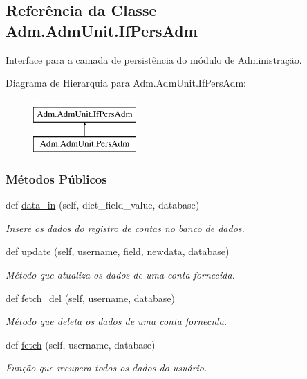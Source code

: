 \hypertarget{classAdm_1_1AdmUnit_1_1IfPersAdm}{}\subsection{Referência da Classe Adm.\+Adm\+Unit.\+If\+Pers\+Adm}
\label{classAdm_1_1AdmUnit_1_1IfPersAdm}


Interface para a camada de persistência do módulo de Administração.  


Diagrama de Hierarquia para Adm.\+Adm\+Unit.\+If\+Pers\+Adm\+:\begin{figure}[H]
\begin{center}
\leavevmode
\includegraphics[height=2.000000cm]{d0/dce/classAdm_1_1AdmUnit_1_1IfPersAdm}
\end{center}
\end{figure}
\subsubsection*{Métodos Públicos}
\begin{DoxyCompactItemize}
\item 
def \hyperlink{classAdm_1_1AdmUnit_1_1IfPersAdm_abf01de08eb9d6517cdcb44321ea12ce7}{data\+\_\+in} (self, dict\+\_\+field\+\_\+value, database)
\begin{DoxyCompactList}\small\item\em Insere os dados do registro de contas no banco de dados. \end{DoxyCompactList}\item 
def \hyperlink{classAdm_1_1AdmUnit_1_1IfPersAdm_a34acb7c8c60b0e90429cfbcc28424852}{update} (self, username, field, newdata, database)
\begin{DoxyCompactList}\small\item\em Método que atualiza os dados de uma conta fornecida. \end{DoxyCompactList}\item 
def \hyperlink{classAdm_1_1AdmUnit_1_1IfPersAdm_a6e9771c86560ed5b7d38fbf6bd40cec8}{fetch\+\_\+del} (self, username, database)
\begin{DoxyCompactList}\small\item\em Método que deleta os dados de uma conta fornecida. \end{DoxyCompactList}\item 
def \hyperlink{classAdm_1_1AdmUnit_1_1IfPersAdm_ac439faae9802d9828eee269548ff2661}{fetch} (self, username, database)
\begin{DoxyCompactList}\small\item\em Função que recupera todos os dados do usuário. \end{DoxyCompactList}\end{DoxyCompactItemize}


